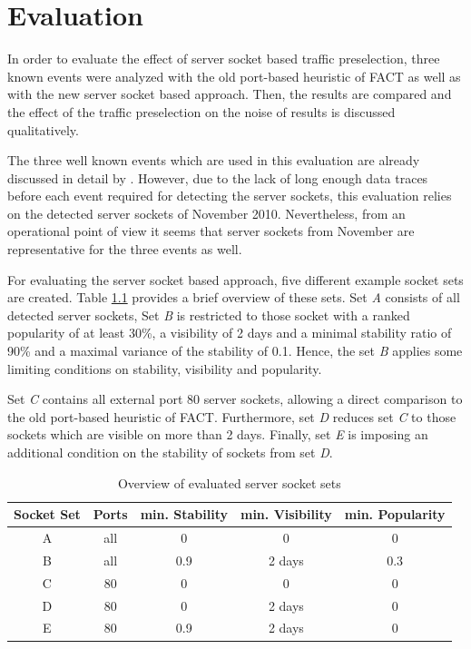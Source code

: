 

\chapter{Evaluation 
\label{chapter:results}}

In order to evaluate the effect of \gls{server socket} based traffic preselection, three known events were analyzed with the old port-based heuristic of \gls{FACT} as well as with the new \gls{server socket} based approach. Then, the results are 
compared and the effect of the traffic preselection on the noise of results is  
discussed qualitatively.

The three well known events which are used in this evaluation are already 
discussed in detail by \citet{SchatzmannPAM2011}. However, due to the lack of 
long enough data traces before each event required for detecting the server 
sockets, this evaluation relies on the detected \glspl{server socket} of 
November 2010. 
Nevertheless, from an operational point of view it seems that 
\glspl{server socket} from November are representative for the three events as 
well. 

For evaluating the \gls{server socket} based approach, five different example 
socket sets are created. Table \ref{tab:ses_sets} provides a brief overview of 
these sets. Set \emph{A} consists of all detected \glspl{server socket}, Set 
\emph{B} is restricted to those socket with a ranked popularity of at least 
30\%, a visibility of 2 days and a minimal stability ratio of 90\% and a maximal 
variance of the stability of 0.1. Hence, the set \emph{B} applies some limiting 
conditions on stability, visibility and popularity. 

Set \emph{C} contains all external port 80 \glspl{server socket}, allowing a 
direct comparison to the old port-based heuristic of \gls{FACT}. 
Furthermore, set \emph{D} reduces set \emph{C} to those sockets which are 
visible on more than 2 days. 
Finally, set \emph{E} is imposing an additional condition on the stability of 
sockets from set \emph{D}. 

\begin{table}
	[ht] \centering 
	\begin{tabular}
		{|c|c|c|c|c|} \hline \textbf{Socket Set} & \textbf{Ports} & \textbf{min. Stability} & \textbf{min. Visibility} & \textbf{min. Popularity} \\
		\hline \hline A & all & 0 & 0 & 0\\
		\hline B & all & 0.9 & 2 days & 0.3 \\
		\hline C & 80 & 0 & 0 & 0 \\
		\hline D & 80 & 0 & 2 days & 0 \\
		\hline E & 80 & 0.9 & 2 days & 0 \\
		\hline 
	\end{tabular}
	\caption{Overview of evaluated \gls{server socket} sets} 
	\label{tab:ses_sets} 
\end{table}

